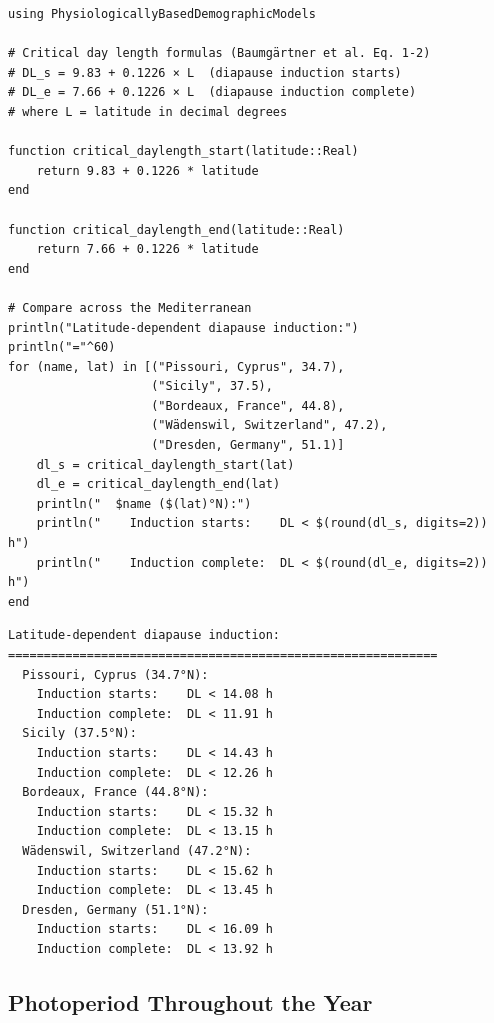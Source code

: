 \begin{verbatim}
using PhysiologicallyBasedDemographicModels

# Critical day length formulas (Baumgärtner et al. Eq. 1-2)
# DL_s = 9.83 + 0.1226 × L  (diapause induction starts)
# DL_e = 7.66 + 0.1226 × L  (diapause induction complete)
# where L = latitude in decimal degrees

function critical_daylength_start(latitude::Real)
    return 9.83 + 0.1226 * latitude
end

function critical_daylength_end(latitude::Real)
    return 7.66 + 0.1226 * latitude
end

# Compare across the Mediterranean
println("Latitude-dependent diapause induction:")
println("="^60)
for (name, lat) in [("Pissouri, Cyprus", 34.7),
                    ("Sicily", 37.5),
                    ("Bordeaux, France", 44.8),
                    ("Wädenswil, Switzerland", 47.2),
                    ("Dresden, Germany", 51.1)]
    dl_s = critical_daylength_start(lat)
    dl_e = critical_daylength_end(lat)
    println("  $name ($(lat)°N):")
    println("    Induction starts:    DL < $(round(dl_s, digits=2)) h")
    println("    Induction complete:  DL < $(round(dl_e, digits=2)) h")
end
\end{verbatim}




\begin{verbatim}
Latitude-dependent diapause induction:
============================================================
  Pissouri, Cyprus (34.7°N):
    Induction starts:    DL < 14.08 h
    Induction complete:  DL < 11.91 h
  Sicily (37.5°N):
    Induction starts:    DL < 14.43 h
    Induction complete:  DL < 12.26 h
  Bordeaux, France (44.8°N):
    Induction starts:    DL < 15.32 h
    Induction complete:  DL < 13.15 h
  Wädenswil, Switzerland (47.2°N):
    Induction starts:    DL < 15.62 h
    Induction complete:  DL < 13.45 h
  Dresden, Germany (51.1°N):
    Induction starts:    DL < 16.09 h
    Induction complete:  DL < 13.92 h
\end{verbatim}



\subsection{Photoperiod Throughout the Year}



\label{8663697950140929664}{}



